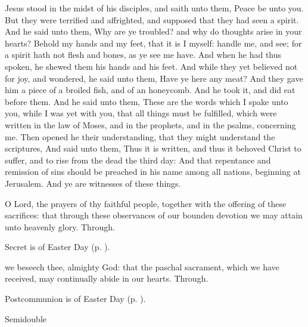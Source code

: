  Jesus stood in the midst of his disciples, and saith unto them, Peace be unto you. But they were terrified and affrighted, and supposed that they had seen a spirit. And he said unto them, Why are ye troubled? and why do thoughts arise in your hearts? Behold my hands and my feet, that it is I myself: handle me, and see; for a spirit hath not flesh and bones, as ye see me have. And when he had thus spoken, he shewed them his hands and his feet. And while they yet believed not for joy, and wondered, he said unto them, Have ye here any meat? And they gave him a piece of a broiled fish, and of an honeycomb. And he took it, and did eat before them. And he said unto them, These are the words which I spake unto you, while I was yet with you, that all things must be fulfilled, which were written in the law of Moses, and in the prophets, and in the psalms, concerning me. Then opened he their understanding, that they might understand the scriptures, And said unto them, Thus it is written, and thus it behoved Christ to suffer, and to rise from the dead the third day: And that repentance and remission of sins should be preached in his name among all nations, beginning at Jerusalem. And ye are witnesses of these things.


\secret
{} O Lord, the prayers of thy faithful people, together with the offering of these sacrifices: that through these observances of our bounden devotion we may attain unto heavenly glory. Through.
\begin{rubric}
     Secret is of Easter Day (p. \pageref{EasterSecret}).
\end{rubric}


\postcommunion
{} we beseech thee, almighty God: that the paschal sacrament, which we have received, may continually abide in our hearts. Through.
\begin{rubric}
     Postcommunion is of Easter Day (p. \pageref{EasterPostcommunion}).
\end{rubric}


\begin{inhead}
    {Semidouble}
\end{inhead}

